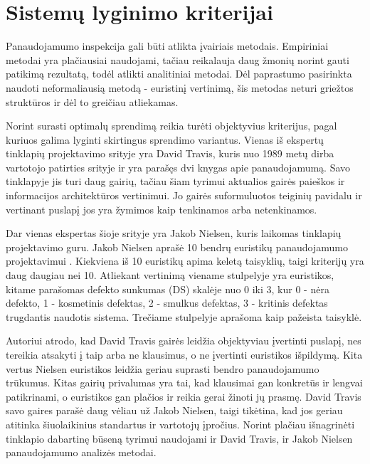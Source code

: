 \documentclass{VUMIFPSbakalaurinis}
\begin{document}
\section{Sistemų lyginimo kriterijai}
Panaudojamumo inspekcija gali būti atlikta įvairiais metodais. Empiriniai metodai yra plačiausiai naudojami\cite{NielsenUsabilityEn}, tačiau reikalauja daug žmonių norint gauti patikimą rezultatą, todėl atlikti analitiniai metodai. Dėl paprastumo pasirinkta naudoti neformaliausią metodą - euristinį vertinimą, šis metodas neturi griežtos struktūros ir dėl to greičiau atliekamas.

Norint surasti optimalų sprendimą reikia turėti objektyvius kriterijus, pagal kuriuos galima lyginti skirtingus sprendimo variantus. Vienas iš ekspertų tinklapių projektavimo srityje yra David Travis, kuris nuo 1989 metų dirba vartotojo patirties srityje ir yra parašęs dvi knygas apie panaudojamumą. Savo tinklapyje jis turi daug gairių, tačiau šiam tyrimui aktualios gairės paieškos ir informacijos architektūros vertinimui. Jo gairės suformuluotos teiginių pavidalu ir vertinant puslapį jos yra žymimos kaip tenkinamos arba netenkinamos\cite{SearchGuidelinesEn}\cite{NavigationAndIAGuidelinesEn}. 

Dar vienas ekspertas šioje srityje yra Jakob Nielsen, kuris laikomas tinklapių projektavimo guru. Jakob Nielsen aprašė 10 bendrų euristikų panaudojamumo projektavimui \cite{NielsenHeuristicsEn}. Kiekviena iš 10 euristikų apima keletą taisyklių, taigi kriterijų yra daug daugiau nei 10. Atliekant vertinimą viename stulpelyje yra euristikos, kitame parašomas defekto sunkumas (DS) skalėje nuo 0 iki 3, kur 0 - nėra defekto, 1 - kosmetinis defektas, 2 - smulkus defektas, 3 - kritinis defektas trugdantis naudotis sistema. Trečiame stulpelyje aprašoma kaip pažeista taisyklė.

Autoriui atrodo, kad David Travis gairės leidžia objektyviau įvertinti puslapį, nes tereikia atsakyti į taip arba ne klausimus, o ne įvertinti euristikos išpildymą. Kita vertus Nielsen euristikos leidžia geriau suprasti bendro panaudojamumo trūkumus. Kitas gairių privalumas yra tai, kad klausimai gan konkretūs ir lengvai patikrinami, o euristikos gan plačios ir reikia gerai žinoti jų prasmę. David Travis savo gaires parašė daug vėliau už Jakob Nielsen, taigi tikėtina, kad jos geriau atitinka šiuolaikinius standartus ir vartotojų įpročius. Norint plačiau išnagrinėti tinklapio dabartinę būseną tyrimui naudojami ir David Travis, ir Jakob Nielsen panaudojamumo analizės metodai.
\end{document}
